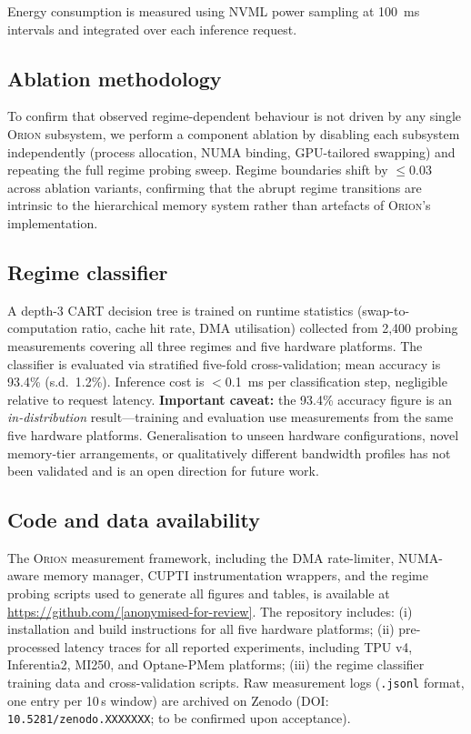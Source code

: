 Energy consumption is measured using NVML power sampling at 100~ms
intervals and integrated over each inference request.

\subsection*{Ablation methodology}

To confirm that observed regime-dependent behaviour is not driven by any single
\textsc{Orion} subsystem, we perform a component ablation by disabling each
subsystem independently (process allocation, NUMA binding, GPU-tailored
swapping) and repeating the full regime probing sweep.
Regime boundaries shift by $\leq 0.03$ across ablation variants, confirming
that the abrupt regime transitions are intrinsic to the hierarchical memory system
rather than artefacts of \textsc{Orion}'s implementation.

\subsection*{Regime classifier}

A depth-3 CART decision tree is trained on runtime statistics
(swap-to-computation ratio, cache hit rate, DMA utilisation) collected from
2,400 probing measurements covering all three regimes and five hardware
platforms.
The classifier is evaluated via stratified five-fold cross-validation; mean
accuracy is 93.4\% (s.d.\ 1.2\%).
Inference cost is $<$0.1~ms per classification step, negligible relative to
request latency.
\textbf{Important caveat:} the 93.4\% accuracy figure is an
\emph{in-distribution} result---training and evaluation use measurements from
the same five hardware platforms.
Generalisation to unseen hardware configurations, novel memory-tier
arrangements, or qualitatively different bandwidth profiles has not been
validated and is an open direction for future work.

\subsection*{Code and data availability}

The \textsc{Orion} measurement framework, including the DMA rate-limiter,
NUMA-aware memory manager, CUPTI instrumentation wrappers, and the regime
probing scripts used to generate all figures and tables, is available at
\url{https://github.com/[anonymised-for-review]}.
The repository includes: (i) installation and build instructions for all
five hardware platforms; (ii) pre-processed latency traces for all reported
experiments, including TPU v4, Inferentia2, MI250, and Optane-PMem platforms;
(iii) the regime classifier training data and cross-validation scripts.
Raw measurement logs (\texttt{.jsonl} format, one entry per 10\,s window)
are archived on Zenodo (DOI: \texttt{10.5281/zenodo.XXXXXXX}; to be
confirmed upon acceptance).

